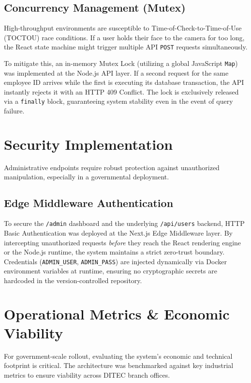 \documentclass[12pt,a4paper]{report}
\begin{document}
\section{Concurrency Management (Mutex)}
High-throughput environments are susceptible to Time-of-Check-to-Time-of-Use (TOCTOU) race conditions. If a user holds their face to the camera for too long, the React state machine might trigger multiple API \texttt{POST} requests simultaneously. 

To mitigate this, an in-memory Mutex Lock (utilizing a global JavaScript \texttt{Map}) was implemented at the Node.js API layer. If a second request for the same employee ID arrives while the first is executing its database transaction, the API instantly rejects it with an HTTP 409 Conflict. The lock is exclusively released via a \texttt{finally} block, guaranteeing system stability even in the event of query failure.

\chapter{Security Implementation}
\onehalfspacing
Administrative endpoints require robust protection against unauthorized manipulation, especially in a governmental deployment.

\section{Edge Middleware Authentication}
To secure the \texttt{/admin} dashboard and the underlying \texttt{/api/users} backend, HTTP Basic Authentication was deployed at the Next.js Edge Middleware layer. By intercepting unauthorized requests \textit{before} they reach the React rendering engine or the Node.js runtime, the system maintains a strict zero-trust boundary. Credentials (\texttt{ADMIN\_USER}, \texttt{ADMIN\_PASS}) are injected dynamically via Docker environment variables at runtime, ensuring no cryptographic secrets are hardcoded in the version-controlled repository.

\chapter{Operational Metrics \& Economic Viability}
\onehalfspacing
For government-scale rollout, evaluating the system's economic and technical footprint is critical. The architecture was benchmarked against key industrial metrics to ensure viability across DITEC branch offices.
\end{document}
